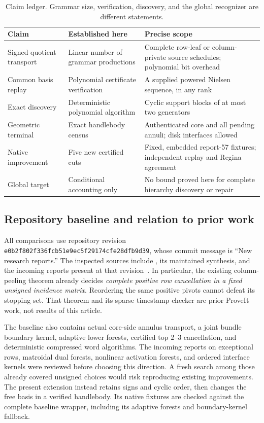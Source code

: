 \documentclass[11pt,a4paper]{article}
\theoremstyle{definition}
\theoremstyle{remark}
\newcommand{\basecommit}{\texttt{e0b2f802f336fcb51e9ec5f29174cfe28dfb9d39}}
\begin{document}
\begin{table}[ht]
\centering\small
\begin{tabularx}{\textwidth}{@{}p{34mm}YY@{}}
\toprule
Claim & Established here & Precise scope\\
\midrule
Signed quotient transport & Linear number of grammar productions & Complete
row-leaf or column-private source schedules; polynomial bit overhead\\
Common basis replay & Polynomial certificate verification & A supplied
powered Nielsen sequence, in any rank\\
Exact discovery & Deterministic polynomial algorithm & Cyclic support blocks
of at most two generators\\
Geometric terminal & Exact handlebody census & Authenticated core and all
pending annuli; disk interfaces allowed\\
Native improvement & Five new certified cuts & Fixed, embedded report-57
fixtures; independent replay and Regina agreement\\
Global target & Conditional accounting only & No bound proved here for
complete hierarchy discovery or repair\\
\bottomrule
\end{tabularx}
\caption{Claim ledger. Grammar size, verification, discovery, and the global
recognizer are different statements.}
\label{tab:claims}
\end{table}

\subsection{Repository baseline and relation to prior work}

All comparisons use repository revision \basecommit, whose commit message
is ``New research reports.'' The inspected sources include
, its maintained synthesis, and the
incoming reports present at that revision~\cite{proveit2026}. In particular,
the existing column-peeling theorem already decides \emph{complete positive
row cancellation in a fixed unsigned incidence matrix}. Reordering the
same positive pivots cannot defeat its stopping set. That theorem and its
sparse timestamp checker are prior ProveIt work, not results of this article.

The baseline also contains actual core-side annulus transport, a joint
bundle boundary kernel, adaptive lower forests, certified top 2--3
cancellation, and deterministic compressed word algorithms. The incoming
reports on exceptional rows, matroidal dual forests, nonlinear activation
forests, and ordered interface kernels were reviewed before choosing this
direction. A fresh search among those already covered unsigned choices
would risk reproducing existing improvements. The present extension instead
retains signs and cyclic order, then changes the free basis in a verified
handlebody. Its native fixtures are checked against the complete baseline
wrapper, including its adaptive forests and boundary-kernel fallback.
\end{document}
